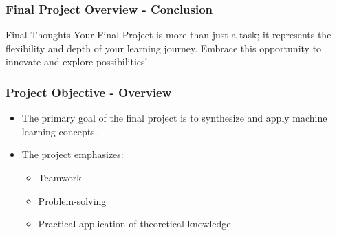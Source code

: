 \documentclass{beamer}
\begin{document}
\begin{frame}[fragile]
    \frametitle{Final Project Overview - Conclusion}
    \begin{block}{Final Thoughts}
        Your Final Project is more than just a task; it represents the flexibility and depth of 
        your learning journey. Embrace this opportunity to innovate and explore possibilities!
    \end{block}
\end{frame}

\begin{frame}[fragile]
    \frametitle{Project Objective - Overview}
    \begin{itemize}
        \item The primary goal of the final project is to synthesize and apply machine learning concepts.
        \item The project emphasizes:
        \begin{itemize}
            \item Teamwork
            \item Problem-solving
            \item Practical application of theoretical knowledge
        \end{itemize}
    \end{itemize}
\end{frame}
\end{document}
